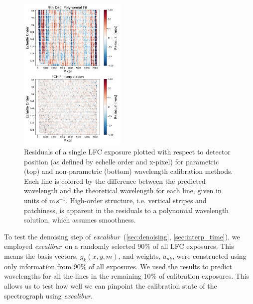 \documentclass[twocolumn,table,xcolor,trackchanges]{aastex63}
\newcommand{\project}[1]{\textsl{#1}}
\newcommand{\name}{\project{excalibur}}
\newcommand{\mps}{\mathrm{m\,s^{-1}}}
\begin{document}
\begin{figure}[h]
\centering
\includegraphics[width=0.455\textwidth]{Figures/lineResids2D_col.pdf}
\caption{Residuals of a single LFC exposure plotted with respect to detector position (as defined by echelle order and x-pixel) for parametric (top) and non-parametric (bottom) wavelength calibration methods.  Each line is colored by the difference between the predicted wavelength and the theoretical wavelength for each line, given in units of $\mps$.  High-order structure, i.e. vertical stripes and patchiness, is apparent in the residuals to a polynomial wavelength solution, which assumes smoothness.}
\label{fig:resid2d}
\end{figure}

To test the denoising step of \name\ (\textsection \ref{sec:denoising}, \textsection\ref{sec:interp_time}), we employed \name\ on a randomly selected 90\% of all LFC exposures.  This means the basis vectors, $g_k(x,y,m)$,  and weights, $a_{nk}$, were constructed using only information from 90\% of all exposures.  We used the results to predict wavelengths for all the lines in the remaining 10\% of calibration exposures.  This allows us to test how well we can pinpoint the calibration state of the spectrograph using \name.

\end{document}
